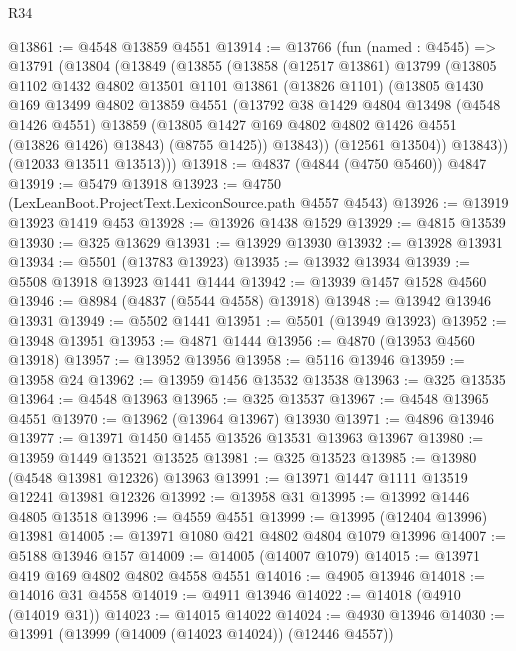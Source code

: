 \begin{lexlean}{R34}
\begin{coremodule}
@13861 := @4548 @13859 @4551
@13914 := @13766
    (fun (named : @4545) =>
    @13791
      (@13804
        (@13849
          (@13855
            (@13858
              (@12517 @13861)
              @13799
              (@13805
                @1102
                @1432
                @4802
                @13501
                @1101
                @13861
                (@13826 @1101)
                (@13805
                  @1430
                  @169
                  @13499
                  @4802
                  @13859
                  @4551
                  (@13792
                    @38
                    @1429
                    @4804
                    @13498
                    (@4548 @1426 @4551)
                    @13859
                    (@13805 @1427 @169 @4802 @4802 @1426 @4551 (@13826 @1426) @13843)
                    (@8755 @1425))
                  @13843))
              (@12561 @13504))
            @13843))
        (@12033 @13511 @13513)))
@13918 := @4837 (@4844 (@4750 @5460)) @4847
@13919 := @5479 @13918
@13923 := @4750 (LexLeanBoot.ProjectText.LexiconSource.path @4557 @4543)
@13926 := @13919 @13923 @1419 @453
@13928 := @13926 @1438 @1529
@13929 := @4815 @13539
@13930 := @325 @13629
@13931 := @13929 @13930
@13932 := @13928 @13931
@13934 := @5501 (@13783 @13923)
@13935 := @13932 @13934
@13939 := @5508 @13918 @13923 @1441 @1444
@13942 := @13939 @1457 @1528 @4560
@13946 := @8984 (@4837 (@5544 @4558) @13918)
@13948 := @13942 @13946 @13931
@13949 := @5502 @1441
@13951 := @5501 (@13949 @13923)
@13952 := @13948 @13951
@13953 := @4871 @1444
@13956 := @4870 (@13953 @4560 @13918)
@13957 := @13952 @13956
@13958 := @5116 @13946
@13959 := @13958 @24
@13962 := @13959 @1456 @13532 @13538
@13963 := @325 @13535
@13964 := @4548 @13963
@13965 := @325 @13537
@13967 := @4548 @13965 @4551
@13970 := @13962 (@13964 @13967) @13930
@13971 := @4896 @13946
@13977 := @13971 @1450 @1455 @13526 @13531 @13963 @13967
@13980 := @13959 @1449 @13521 @13525
@13981 := @325 @13523
@13985 := @13980 (@4548 @13981 @12326) @13963
@13991 := @13971 @1447 @1111 @13519 @12241 @13981 @12326
@13992 := @13958 @31
@13995 := @13992 @1446 @4805 @13518
@13996 := @4559 @4551
@13999 := @13995 (@12404 @13996) @13981
@14005 := @13971 @1080 @421 @4802 @4804 @1079 @13996
@14007 := @5188 @13946 @157
@14009 := @14005 (@14007 @1079)
@14015 := @13971 @419 @169 @4802 @4802 @4558 @4551
@14016 := @4905 @13946
@14018 := @14016 @31 @4558
@14019 := @4911 @13946
@14022 := @14018 (@4910 (@14019 @31))
@14023 := @14015 @14022
@14024 := @4930 @13946
@14030 := @13991 (@13999 (@14009 (@14023 @14024)) (@12446 @4557))

\end{coremodule}
\end{lexlean}
